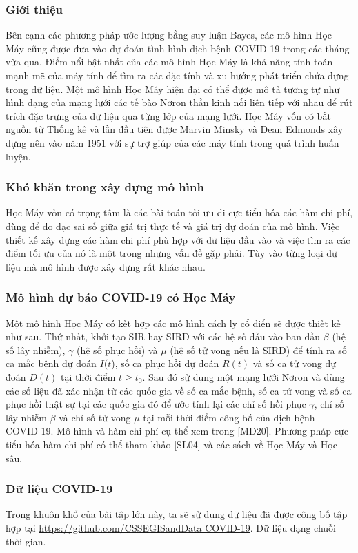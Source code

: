 \documentclass[a4paper]{article}
\begin{document}
\subsubsection{Giới thiệu}
Bên cạnh các phương pháp ước lượng bằng suy luận Bayes, các mô hình Học Máy cũng được đưa vào dự đoán tình hình dịch bệnh COVID-19 trong các tháng vừa qua. Điểm nổi bật nhất của các mô hình Học Máy là khả năng tính toán mạnh mẽ của máy tính để tìm ra các đặc tính và xu hướng phát triển chứa đựng trong dữ liệu. Một mô hình Học Máy hiện đại có thể được mô tả tương tự như hình dạng của mạng lưới các tế bào Nơron thần kinh nối liên tiếp với nhau để rút trích đặc trưng của dữ liệu qua từng lớp của mạng lưới. Học Máy vốn có bắt nguồn từ Thống kê và lần đầu tiên được Marvin Minsky và Dean Edmonds xây dựng nên vào năm 1951 với sự trợ giúp của các máy tính trong quá trình huấn luyện.
\subsubsection{Khó khăn trong xây dựng mô hình}
Học Máy vốn có trọng tâm là các bài toán tối ưu đi cực tiểu hóa các hàm chi phí, dùng để đo đạc sai số giữa giá trị thực tế và giá trị dự đoán của mô hình. Việc thiết kế xây dựng các hàm chi phí phù hợp với dữ liệu đầu vào và việc tìm ra các điểm tối ưu của nó là một trong những vấn đề gặp phải. Tùy vào từng loại dữ liệu mà mô hình được xây dựng rất khác nhau.
\subsubsection{Mô hình dự báo COVID-19 có Học Máy}
Một mô hình Học Máy có kết hợp các mô hình cách ly cổ điển sẽ được thiết kế như sau. Thứ nhất, khởi tạo SIR hay SIRD với các hệ số đầu vào ban đầu $\beta$ (hệ số lây nhiễm), $\gamma$ (hệ số phục hồi) và $\mu$ (hệ số tử vong nếu là SIRD) để tính ra số ca mắc bệnh dự đoán $I(t$), số ca phục hồi dự đoán $R(t)$ và số ca tử vong dự đoán $D(t)$ tại thời điểm $t \geq t_0$. Sau đó sử dụng một mạng lưới Nơron và dùng các số liệu đã xác nhận từ các quốc gia về số ca mắc bệnh, số ca tử vong và số ca phục hồi thật sự tại các quốc gia đó để ước tính lại các chỉ số hồi phục $\gamma$, chỉ số lây nhiễm $\beta$ và chỉ số tử vong $\mu$ tại mỗi thời điểm công bố của dịch bệnh COVID-19. Mô hình và hàm chi phí cụ thể xem trong [MD20]. Phương pháp cực tiểu hóa hàm chi phí có thể tham khảo [SL04] và các sách về Học Máy và Học sâu.
\subsubsection{Dữ liệu COVID-19}
Trong khuôn khổ của bài tập lớn này, ta sẽ sử dụng dữ liệu đã được công bố tập hợp tại \url{https://github.com/CSSEGISandData COVID-19}. Dữ liệu dạng chuỗi thời gian. 
\end{document}
